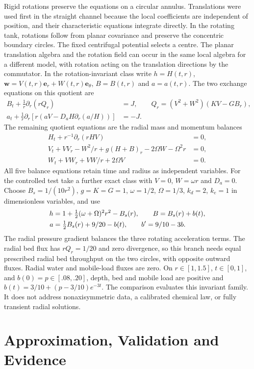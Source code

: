 \documentclass[12pt,a4paper,oneside]{report}
\numberwithin{equation}{chapter}
\theoremstyle{remark}\newtheorem{remark}[theorem]{Remark}
\begin{document}
Rigid rotations preserve the equations on a circular annulus. Translations were used first in the straight channel because the local coefficients are independent of position, and their characteristic equations integrate directly. In the rotating tank, rotations follow from planar covariance and preserve the concentric boundary circles. The fixed centrifugal potential selects a centre. The planar translation algebra and the rotation field can occur in the same local algebra for a different model, with rotation acting on the translation directions by the commutator. In the rotation-invariant class write $h=H(t,r)$, $\mathbf w=V(t,r)\mathbf e_r+W(t,r)\mathbf e_\theta$, $B=B(t,r)$ and $a=a(t,r)$. The two exchange equations on this quotient are
\begin{align*}
 B_t+\frac1r\partial_r(rQ_r)&=J,\qquad Q_r=(V^2+W^2)(KV-GB_r),\\
 a_t+\frac1r\partial_r\!\left[r(aV-D_aH\partial_r(a/H))\right]&=-J .
\end{align*}
The remaining quotient equations are the radial mass and momentum balances
\begin{align*}
 H_t+r^{-1}\partial_r(rHV)&=0,\\
 V_t+VV_r-W^2/r+g(H+B)_r-2\Omega W-\Omega^2 r&=0,\\
 W_t+VW_r+VW/r+2\Omega V&=0 .
\end{align*}
All five balance equations retain time and radius as independent variables.
For the controlled test take a further exact class with $V=0$, $W=\omega r$ and $D_a=0$. Choose $B_s=1/(10r^2)$, $g=K=G=1$, $\omega=1/2$, $\Omega=1/3$, $k_d=2$, $k_e=1$ in dimensionless variables, and use
\begin{align}\label{eq:swirl-exact}
 h&=1+\tfrac12(\omega+\Omega)^2r^2-B_s(r),\qquad B=B_s(r)+b(t),\notag\\
 a&=\tfrac12B_s(r)+9/20-b(t),\qquad b'=9/10-3b .
\end{align}
The radial pressure gradient balances the three rotating acceleration terms. The radial bed flux has $rQ_r=1/20$ and zero divergence, so this branch needs equal prescribed radial bed throughput on the two circles, with opposite outward fluxes. Radial water and mobile-load fluxes are zero. On $r\in[1,1.5]$, $t\in[0,1]$, and $b(0)=p\in[.08,.20]$, depth, bed and mobile load are positive and
$b(t)=3/10+(p-3/10)e^{-3t}$. The comparison evaluates this invariant family. It does not address nonaxisymmetric data, a calibrated chemical law, or fully transient radial solutions.

\chapter{Approximation, Validation and Evidence}\label{ch:computation}
\end{document}
